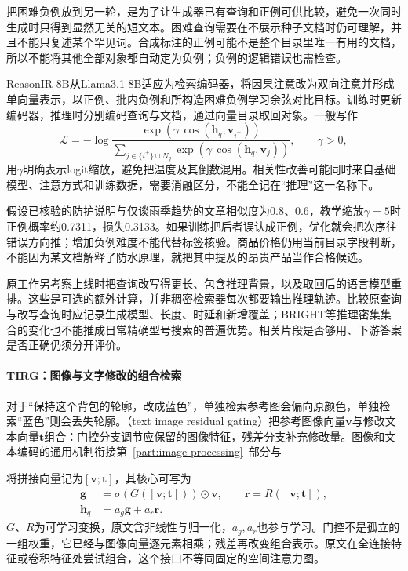把困难负例放到另一轮，是为了让生成器已有查询和正例可供比较，避免一次同时生成时只得到显然无关的短文本。困难查询需要在不展示种子文档时仍可理解，并且不能只复述某个罕见词。合成标注的正例可能不是整个目录里唯一有用的文档，所以不能将其他全部对象都自动定为负例；负例的逻辑错误也需检查。

ReasonIR-8B从Llama3.1-8B适应为检索编码器，将因果注意改为双向注意并形成单向量表示，以正例、批内负例和所构造困难负例学习余弦对比目标。训练时更新编码器，推理时分别编码查询与文档，通过向量目录取回对象。一般写作
\begin{equation}
 \mathcal L=-\log\frac{\exp(\gamma\,\cos(\bm h_q,\bm v_{i^+}))}
 {\sum_{j\in\{i^+\}\cup N_q}\exp(\gamma\,\cos(\bm h_q,\bm v_j))},
 \qquad \gamma>0 ,
 \label{eq:rs-search-reasonir-objective}
\end{equation}
用$\gamma$明确表示logit缩放，避免把温度及其倒数混用。相关性改善可能同时来自基础模型、注意方式和训练数据，需要消融区分，不能全记在“推理”这一名称下。

假设已核验的防护说明与仅谈雨季趋势的文章相似度为0.8、0.6，教学缩放$\gamma=5$时正例概率约0.7311，损失0.3133。如果训练把后者误认成正例，优化就会把次序往错误方向推；增加负例难度不能代替标签核验。商品价格仍用当前目录字段判断，不能因为某文档解释了防水原理，就把其中提及的昂贵产品当作合格候选。

原工作另考察上线时把查询改写得更长、包含推理背景，以及取回后的语言模型重排。这些是可选的额外计算，并非稠密检索器每次都要输出推理轨迹。比较原查询与改写查询时应记录生成模型、长度、时延和新增覆盖；BRIGHT等推理密集集合的变化也不能推成日常精确型号搜索的普遍优势。相关片段是否够用、下游答案是否正确仍须分开评价。

\Needspace{100mm}
\paragraph{TIRG：图像与文字修改的组合检索}
\label{sec:rs-search-tirg}

对于“保持这个背包的轮廓，改成蓝色”，单独检索参考图会偏向原颜色，单独检索“蓝色”则会丢失轮廓。（text image residual gating）把参考图像向量$\bm v$与修改文本向量$\bm t$组合：门控分支调节应保留的图像特征，残差分支补充修改量。图像和文本编码的通用机制衔接第~\ref{part:image-processing}~部分与

将拼接向量记为$[\bm v;\bm t]$，其核心可写为
\begin{equation}
 \begin{split}
 \bm g&=\sigma(G([\bm v;\bm t]))\odot\bm v,\qquad
 \bm r=R([\bm v;\bm t]),\\
 \bm h_q&=a_g\bm g+a_r\bm r .
 \end{split}
 \label{eq:rs-search-tirg}
\end{equation}
$G$、$R$为可学习变换，原文含非线性与归一化，$a_g,a_r$也参与学习。门控不是孤立的一组权重，它已经与图像向量逐元素相乘；残差再改变组合表示。原文在全连接特征或卷积特征处尝试组合，这个接口不等同固定的空间注意力图。

